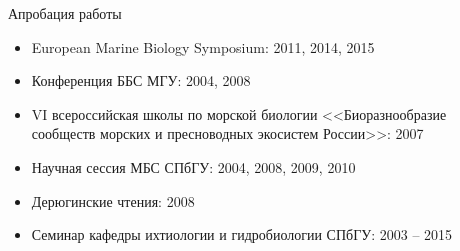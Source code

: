 \documentclass{beamer}
\begin{document}
\begin{frame}{Апробация работы}
\begin{itemize}
	\item{European Marine Biology Symposium: 2011, 2014, 2015}
	\item{Конференция ББС МГУ: 2004, 2008}
	\item{VI всероссийская школы по морской биологии <<Биоразнообразие сообществ морских и пресноводных экосистем России>>: 2007}
	\item{Научная сессия МБС СПбГУ: 2004, 2008, 2009, 2010}
	\item{Дерюгинские чтения: 2008}
	\item{Семинар кафедры ихтиологии и гидробиологии СПбГУ: 2003 -- 2015}
\end{itemize}
\end{frame}
\end{document}
